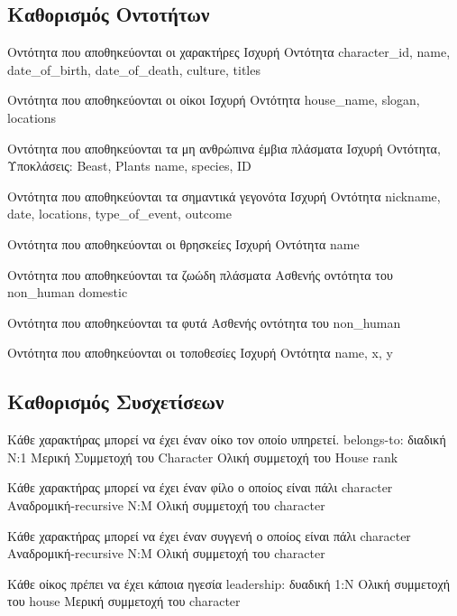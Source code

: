 \documentclass[../main.tex]{subfiles}
\begin{document}
\subsection{Καθορισμός Οντοτήτων}

{Οντότητα που αποθηκεύονται οι χαρακτήρες}
{Ισχυρή Οντότητα}
{character\_id, name, date\_of\_birth, date\_of\_death, culture, titles}

{Οντότητα που αποθηκεύονται οι οίκοι}
{Ισχυρή Οντότητα}
{house\_name, slogan, locations}

{Οντότητα που αποθηκεύονται τα μη ανθρώπινα έμβια πλάσματα}
{Ισχυρή Οντότητα, Υποκλάσεις: Beast, Plants}
{name, species, ID}

{Οντότητα που αποθηκεύονται τα σημαντικά γεγονότα}
{Ισχυρή Οντότητα}
{nickname, date, locations, type\_of\_event, outcome}

{Οντότητα που αποθηκεύονται οι θρησκείες}
{Ισχυρή Οντότητα}
{name}

{Οντότητα που αποθηκεύονται τα ζωώδη πλάσματα}
{Ασθενής οντότητα του non\_human}
{domestic}

{Οντότητα που αποθηκεύονται τα φυτά}
{Ασθενής οντότητα του non\_human}
{}

{Οντότητα που αποθηκεύονται οι τοποθεσίες}
{Ισχυρή Οντότητα}
{name, x, y}



\subsection{Καθορισμός Συσχετίσεων}

{Κάθε χαρακτήρας μπορεί να έχει έναν οίκο τον οποίο υπηρετεί.}
{belongs-to: διαδική}
{N:1}
{Μερική Συμμετοχή του Character \newline Ολική συμμετοχή του House}
{rank}

{Κάθε χαρακτήρας μπορεί να έχει έναν φίλο ο οποίος είναι πάλι character}
{Αναδρομική-recursive}
{N:M}
{Ολική συμμετοχή του character}
{}

{Κάθε χαρακτήρας μπορεί να έχει έναν συγγενή ο οποίος είναι πάλι character}
{Αναδρομική-recursive}
{N:M}
{Ολική συμμετοχή του character}
{}

{Κάθε οίκος πρέπει να έχει κάποια ηγεσία}
{leadership: δυαδική}
{1:Ν}
{Ολική συμμετοχή του house \newline Μερική συμμετοχή του character}
{}
\end{document}
